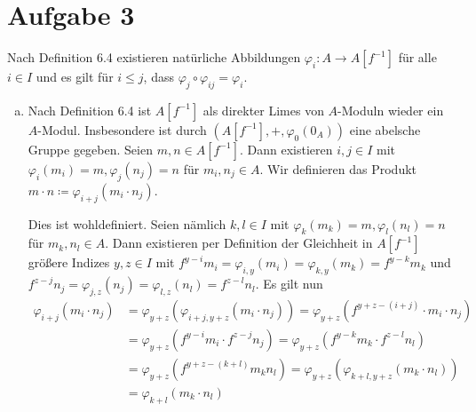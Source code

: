 \documentclass{article}
\begin{document}
\section*{Aufgabe 3}
Nach Definition 6.4 existieren natürliche Abbildungen $\varphi_i\colon A\to A[f^{-1}]$ für alle $i\in I$ und 
es gilt für $i\leq j$, dass $\varphi_j\circ \varphi_{ij} = \varphi_i$.
\begin{enumerate}[(a)]
    \item Nach Definition 6.4 ist $A[f^{-1}]$ als direkter Limes von $A$-Moduln wieder ein $A$-Modul. 
    Insbesondere ist durch $(A[f^{-1}], +, \varphi_0(0_A))$ eine abelsche Gruppe gegeben.
    Seien $m, n \in A[f^{-1}]$. Dann existieren $i, j \in I$ mit $\varphi_i(m_i) = m, \varphi_j(n_j) = n$ für $m_i, n_j \in A$.
    Wir definieren das Produkt $m \cdot n \coloneqq \varphi_{i+j}(m_i \cdot n_j)$.
    
    Dies ist wohldefiniert. Seien nämlich $k, l \in I$ mit $\varphi_k(m_k) = m, \varphi_l(n_l) = n$ für $m_k, n_l \in A$.
    Dann existieren per Definition der Gleichheit in $A[f^{-1}]$ größere Indizes $y, z \in I$ 
    mit $f^{y-i}m_i = \varphi_{i, y}(m_i) = \varphi_{k, y}(m_k) = f^{y-k}m_k$ und $f^{z-j}n_j = \varphi_{j,z}(n_j) = \varphi_{l, z}(n_l) = f^{z-l}n_l$.
    Es gilt nun
    \begin{align*}
        \varphi_{i+j}(m_i \cdot n_j) &= \varphi_{y+z}(\varphi_{i+j, y+z}(m_i\cdot n_j)) = \varphi_{y+z}(f^{y+z-(i+j)} \cdot m_i\cdot n_j)\\
        &= \varphi_{y+z}(f^{y-i}m_i\cdot f^{z-j} n_j) = \varphi_{y+z}(f^{y-k}m_k \cdot f^{z-l} n_l)\\
        &= \varphi_{y+z}(f^{y+z-(k+l)} m_kn_l) = \varphi_{y+z}(\varphi_{k+l, y+z}(m_k\cdot n_l))\\
        &= \varphi_{k+l}(m_k\cdot n_l)
    \end{align*}


\end{enumerate}
\end{document}
